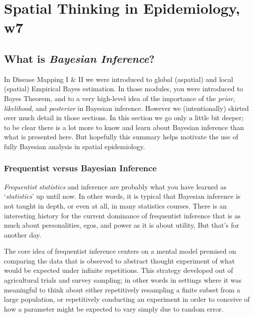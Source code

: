 \documentclass[
]{book}
\begin{document}
\hypertarget{spatial-thinking-in-epidemiology-w7}{%
\section{Spatial Thinking in Epidemiology, w7}\label{spatial-thinking-in-epidemiology-w7}}

\hypertarget{what-is-bayesian-inference}{%
\subsection{\texorpdfstring{What is \emph{Bayesian Inference}?}{What is Bayesian Inference?}}\label{what-is-bayesian-inference}}

In Disease Mapping I \& II we were introduced to global (aspatial) and local (spatial) Empirical Bayes estimation. In those modules, you were introduced to Bayes Theorem, and to a very high-level idea of the importance of the \emph{prior}, \emph{likelihood}, and \emph{posterior} in Bayesian inference. However we (intentionally) skirted over much detail in those sections. In this section we go only a little bit deeper; to be clear there is a lot more to know and learn about Bayesian inference than what is presented here. But hopefully this summary helps motivate the use of fully Bayesian analysis in spatial epidemiology.

\hypertarget{frequentist-versus-bayesian-inference}{%
\subsubsection{Frequentist versus Bayesian Inference}\label{frequentist-versus-bayesian-inference}}

\emph{Frequentist statistics} and inference are probably what you have learned as `\emph{statistics}' up until now. In other words, it is typical that Bayesian inference is not taught in depth, or even at all, in many statistics courses. There is an interesting history for the current dominance of frequentist inference that is as much about personalities, egos, and power as it is about utility. But that's for another day.

The core idea of frequentist inference centers on a mental model premised on comparing the data that is observed to abstract thought experiment of what would be expected under infinite repetitions. This strategy developed out of agricultural trials and survey sampling; in other words in settings where it was meaningful to think about either repetitively resampling a finite subset from a large population, or repetitively conducting an experiment in order to conceive of how a parameter might be expected to vary simply due to random error.
\end{document}
